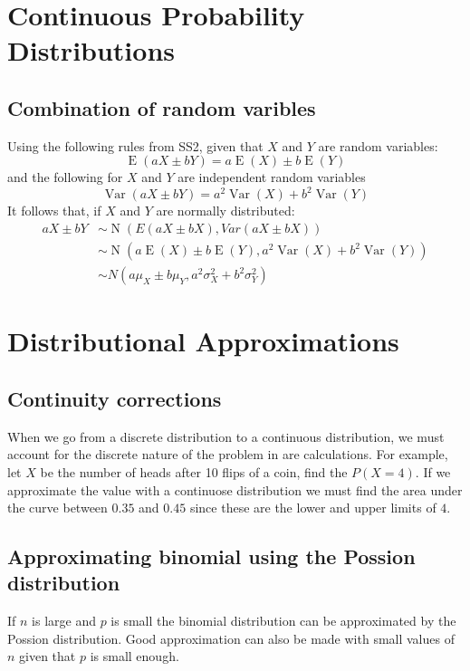 
\section{Continuous Probability Distributions}

    \subsection{Combination of random varibles}
    Using the following rules from SS2, given that $X$ and $Y$ are random variables:
    $$\operatorname{E}(aX \pm bY) = a\operatorname{E}(X) \pm b\operatorname{E}(Y)$$
    and the following for $X$ and $Y$ are independent random variables
    $$
    \operatorname{Var}(aX \pm bY) = a^2\operatorname{Var}(X) + b^2\operatorname{Var}(Y)
    $$
    It follows that, if $X$ and $Y$ are normally distributed:
    \begin{align*}
    aX \pm bY &\sim \operatorname{N}(E(aX \pm bX), Var(aX \pm bX))\\
    &\sim \operatorname{N}(a\operatorname{E}(X) \pm b\operatorname{E}(Y), a^2\operatorname{Var}(X) + b^2\operatorname{Var}(Y))\\
    &\sim N(a \mu_X \pm b \mu_Y, a^2 \sigma_X^2 + b^2 \sigma_Y^2)
    \end{align*}

\section{Distributional Approximations}


    \subsection{Continuity corrections}
        When we go from a discrete distribution to a continuous distribution, we must account for the discrete nature of the problem in are calculations. For example, let $X$ be the number of heads after 10 flips of a coin, find the $P(X = 4)$. If we approximate the value with a continuose distribution we must find the area under the curve between $0.35$ and $0.45$ since these are the lower and upper limits of $4$.


    \subsection{Approximating binomial using the Possion distribution}
        If $n$ is large and $p$ is small the binomial distribution can be approximated by the Possion distribution. Good approximation can also be made with small values of $n$ given that $p$ is small enough.
        
